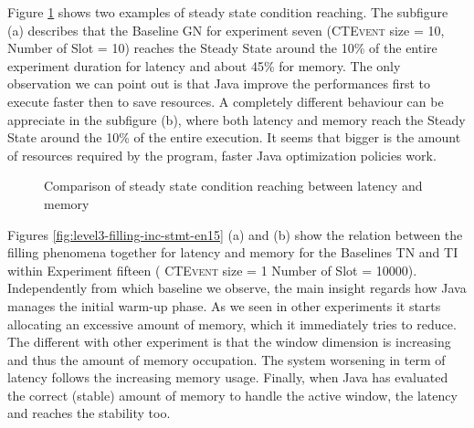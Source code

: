 Figure \ref{fig:level3-steady-naive-graph-en7-12} shows two examples of steady state condition reaching. The subfigure (a) describes that the Baseline GN for experiment seven (\textsc{CTEvent} size = 10, Number of Slot = 10) reaches the Steady State around the 10\% of the entire experiment duration for latency and about 45\% for memory. The only observation we can point out is that Java improve the performances first to execute faster then to save resources. A completely different behaviour can be appreciate in the subfigure (b), where both latency and memory reach the Steady State around the 10\% of the entire execution. It seems that bigger is the amount of resources required by the program, faster Java optimization policies work.


\begin{figure}[tbh]
  \centering
  	\label{fig:level3-steady-naive-graph-en7-12}  	
  	\caption{Comparison of steady state condition reaching between latency and memory} 
\end{figure}

Figures \ref{fig:level3-filling-inc-stmt-en15} (a) and (b) show the relation between the filling phenomena together for latency and memory for the Baselines TN and TI within Experiment fifteen ( \textsc{CTEvent} size = 1 Number of Slot = 10000). Independently from which baseline we observe, the main insight regards how Java manages the initial warm-up phase. As we seen in other experiments it starts allocating an excessive amount of memory, which it immediately tries to reduce. The different with other experiment is that the window dimension is increasing and thus the amount of memory occupation. The system worsening in term of latency follows the increasing memory usage. Finally, when Java has evaluated the correct (stable) amount of memory to handle the active window, the latency and reaches the stability too.


